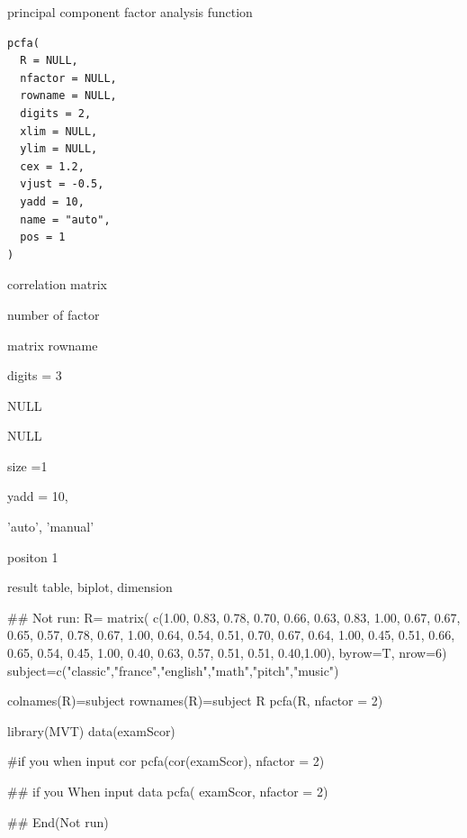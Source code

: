 \documentclass[a4paper]{book}
\begin{document}
%
\begin{Description}
principal component factor analysis function
\end{Description}
%
\begin{Usage}
\begin{verbatim}
pcfa(
  R = NULL,
  nfactor = NULL,
  rowname = NULL,
  digits = 2,
  xlim = NULL,
  ylim = NULL,
  cex = 1.2,
  vjust = -0.5,
  yadd = 10,
  name = "auto",
  pos = 1
)
\end{verbatim}
\end{Usage}
%
\begin{Arguments}
\begin{ldescription}
\item[\code{R}] correlation matrix

\item[\code{nfactor}] number of factor

\item[\code{rowname}] matrix rowname

\item[\code{digits}] digits = 3

\item[\code{xlim}] NULL

\item[\code{ylim}] NULL

\item[\code{cex}] size =1

\item[\code{yadd}] yadd = 10,

\item[\code{name}] 'auto', 'manual'

\item[\code{pos}] positon  1
\end{ldescription}
\end{Arguments}
%
\begin{Value}
result table, biplot, dimension
\end{Value}
%
\begin{Examples}
\begin{ExampleCode}
\#\# Not run: 
R= matrix(
c(1.00, 0.83, 0.78, 0.70, 0.66, 0.63,
  0.83, 1.00, 0.67, 0.67, 0.65, 0.57,
  0.78, 0.67, 1.00, 0.64, 0.54, 0.51,
  0.70, 0.67, 0.64, 1.00, 0.45, 0.51,
  0.66, 0.65, 0.54, 0.45, 1.00, 0.40,
  0.63, 0.57, 0.51, 0.51, 0.40,1.00),
 byrow=T, nrow=6)
subject=c("classic","france","english","math","pitch","music")

colnames(R)=subject
rownames(R)=subject
R
pcfa(R, nfactor = 2)

library(MVT)
data(examScor)

#if you when input cor
pcfa(cor(examScor), nfactor = 2)

## if you When input data
pcfa( examScor, nfactor = 2)


## End(Not run)

\end{ExampleCode}
\end{Examples}
\end{document}

